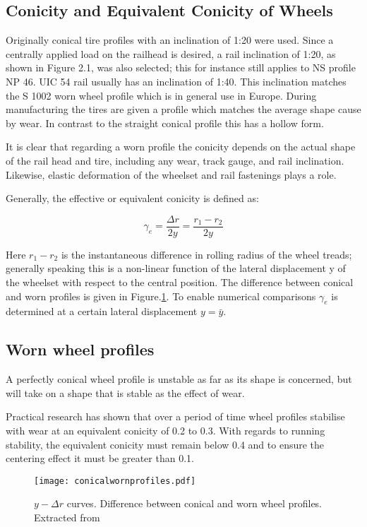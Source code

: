 \subsection{Conicity and Equivalent Conicity of Wheels}

Originally conical tire profiles with an inclination of 1:20 were used. Since a centrally applied load on the railhead is desired, a rail inclination of 1:20, as shown in Figure 2.1, was also selected; this for instance still applies to NS profile NP 46. UIC 54 rail usually has an inclination of 1:40. This inclination matches the S 1002 worn wheel profile which is in general use in Europe. During manufacturing the tires are given a profile which matches the average shape cause by wear. In contrast to the straight conical profile this has a hollow form.

It is clear that regarding a worn profile the conicity depends on the actual shape of the rail head and tire, including any wear, track gauge, and rail inclination. Likewise, elastic deformation of the wheelset and rail fastenings plays a role.

Generally, the effective or equivalent conicity is defined as:

$$ \gamma_e = \frac{\Delta r}{2y} = \frac{r_1 - r_2}{2y}  $$

Here $r_1 - r_2$ is the instantaneous difference in rolling radius of the wheel treads; generally speaking this is a non-linear function of the lateral displacement y of the wheelset with respect to the central position. The difference between conical and worn profiles is given in Figure.\ref{fig:conicalwornprofiles}. To enable numerical comparisons $\gamma_e$ is determined at a certain lateral displacement $y=\bar{y}$.

\subsection{Worn wheel profiles}

A perfectly conical wheel profile is unstable as far as its shape is concerned, but will take on a shape that is stable as the effect of wear.

Practical research has shown that over a period of time wheel profiles stabilise with wear at an equivalent conicity of 0.2 to 0.3. With regards to running stability, the equivalent conicity must remain below 0.4 and to ensure the centering effect it must be greater than 0.1.

\begin{figure}[h]
    \centering
    \texttt{[image: conicalwornprofiles.pdf]}
    \caption{$y-\Delta r$ curves. Difference between conical and worn wheel profiles. Extracted from \cite[2.4]{esveld2001modern}}
    \label{fig:conicalwornprofiles}
\end{figure}

